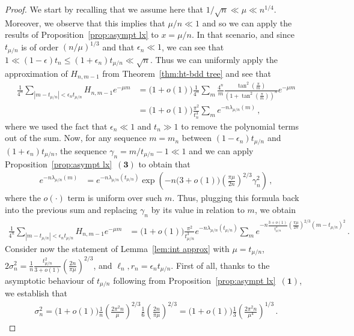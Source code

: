 \documentclass{article}
\newcommand{\1}{\mathbbm{1}}								%
\theoremstyle{definition}
\numberwithin{equation}{section}
\newcommand{\numitem}[1]{$\mathbf{(#1)}$}
\begin{document}
\begin{proof}
    We start by recalling that we assume here that $1/\sqrt{n}\ll\mu\ll n^{1/4}$.
    Moreover, we observe that this implies that $\mu/n\ll1$ and so we can apply the results of Proposition~\ref{prop:asympt lx} to $x=\mu/n$.
    In that scenario, and since $t_{\mu/n}$ is of order $(n/\mu)^{1/3}$ and that $\epsilon_n\ll1$, we can see that $1\ll(1-\epsilon)t_n\leq(1+\epsilon_n)t_{\mu/n}\ll\sqrt{n}$.
    Thus we can uniformly apply the approximation of $H_{n,m-1}$ from Theorem~\ref{thm:ht-bdd tree} and see that
    \begin{align*}
        \frac{1}{4^n}\sum_{|m-t_{\mu/n}|<\epsilon_nt_{\mu/n}}H_{n,m-1}e^{-\mu m}&=\big(1+o(1)\big)\frac{1}{4^n}\sum_m\frac{4^n}{m}\frac{\tan^2\left(\frac{\pi}{m}\right)}{\left(1+\tan^2\left(\frac{\pi}{m}\right)\right)^n}e^{-\mu m}\\
        &=\big(1+o(1)\big)\frac{\pi^2}{t_n^3}\sum_me^{-n\lambda_{\mu/n}(m)}\,,
    \end{align*}
    where we used the fact that $\epsilon_n\ll1$ and $t_n\gg1$ to remove the polynomial terms out of the sum.
    Now, for any sequence $m=m_n$ between $(1-\epsilon_n)t_{\mu/n}$ and $(1+\epsilon_n)t_{\mu/n}$, the sequence $\gamma_n=m/t_{\mu/n}-1\ll1$ and we can apply Proposition~\ref{prop:asympt lx}~\numitem{3} to obtain that
    \begin{align*}
        e^{-n\lambda_{\mu/n}(m)}&=e^{-n\lambda_{\mu/n}(t_{\mu/n})}\exp\left(-n\big(3+o(1)\big)\left(\frac{\pi\mu}{2n}\right)^{2/3}\gamma_n^2\right)\,,
    \end{align*}
    where the $o(\cdot)$ term is uniform over such $m$.
    Thus, plugging this formula back into the previous sum and replacing $\gamma_n$ by its value in relation to $m$, we obtain
    \begin{align*}
        \frac{1}{4^n}\sum_{|m-t_{\mu/n}|<\epsilon_nt_{\mu/n}}H_{n,m-1}e^{-\mu m}&=\big(1+o(1)\big)\frac{\pi^2}{t_{\mu/n}^3}e^{-n\lambda_{\mu/n}(t_{\mu/n})}\sum_me^{-n\frac{3+o(1)}{t_{\mu/n}^2}\left(\frac{\pi\mu}{2n}\right)^{2/3}(m-t_{\mu/n})^2}\,.
    \end{align*}
    Consider now the statement of Lemma~\ref{lem:int approx} with $\mu=t_{\mu/n}$, $2\sigma_n^2=\frac{1}{n}\frac{t_{\mu/n}^2}{3+o(1)}\left(\frac{2n}{\pi\mu}\right)^{2/3}$, and $\ell_n,r_n=\epsilon_nt_{\mu/n}$.
    First of all, thanks to the asymptotic behaviour of $t_{\mu/n}$ following from Proposition~\ref{prop:asympt lx}~\numitem{1}, we establish that
    \begin{align*}
        \sigma_n^2=\big(1+o(1)\big)\frac{1}{n}\left(\frac{2\pi^2n}{\mu}\right)^{2/3}\frac{1}{6}\left(\frac{2n}{\pi\mu}\right)^{2/3}=\big(1+o(1)\big)\frac{1}{3}\left(\frac{2\pi^2n}{\mu^4}\right)^{1/3}\,.

\end{align*}
\end{proof}
\end{document}
